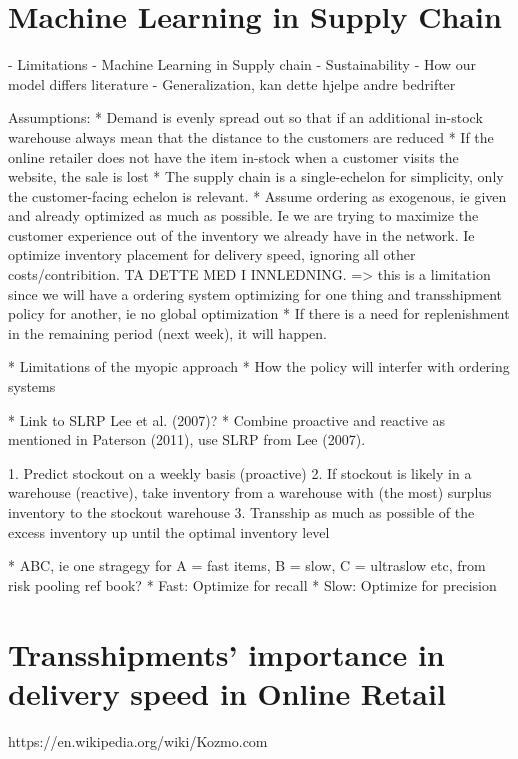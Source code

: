 \documentclass[../../main.tex]{subfiles}
\begin{document}

\section{Machine Learning in Supply Chain}


- Limitations
- Machine Learning in Supply chain
- Sustainability
- How our model differs literature
- Generalization, kan dette hjelpe andre bedrifter

Assumptions:
* Demand is evenly spread out so that if an additional in-stock warehouse always mean that the distance to the customers are reduced
* If the online retailer does not have the item in-stock when a customer visits the website, the sale is lost
* The supply chain is a single-echelon for simplicity, only the customer-facing echelon is relevant.
* Assume ordering as exogenous, ie given and already optimized as much as possible. Ie we are trying to maximize the customer experience out of the inventory we already have in the network. Ie optimize inventory placement for delivery speed, ignoring all other costs/contribition. TA DETTE MED I INNLEDNING.
=> this is a limitation since we will have a ordering system optimizing for one thing and transshipment policy for another, ie no global optimization
* If there is a need for replenishment in the remaining period (next week), it will happen.

* Limitations of the myopic approach
* How the policy will interfer with ordering systems



* Link to SLRP Lee et al. (2007)?
  * Combine proactive and reactive as mentioned in Paterson (2011), use SLRP from Lee (2007).

1.	Predict stockout on a weekly basis (proactive)
2.	If stockout is likely in a warehouse (reactive), take inventory from a warehouse with (the most) surplus inventory to the stockout warehouse
3.	Transship as much as possible of the excess inventory up until the optimal inventory level

*	ABC, ie one stragegy for A = fast items, B = slow, C = ultraslow etc, from risk pooling ref book? 
  * Fast: Optimize for recall
  * Slow: Optimize for precision

\section{Transshipments' importance in delivery speed in Online Retail}
https://en.wikipedia.org/wiki/Kozmo.com
\end{document}
